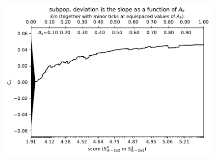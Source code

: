 \documentclass{article}
\newlength{\vertsep}
\newlength{\imsize}
\begin{document}
\begin{figure}
\begin{centering}

\parbox{\imsize}{\includegraphics[width=\imsize]
{../codes/weighted/County_of_Riverside_vs_Butte-LNGI/cumulative.pdf}}

\vspace{\vertsep}


\end{centering}
\end{figure}
\end{document}

